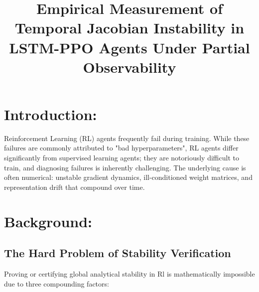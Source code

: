 \documentclass[11pt,a4paper]{article}
\title{\textbf{Empirical Measurement of Temporal Jacobian Instability in LSTM-PPO Agents Under Partial Observability }}
\begin{document}
\maketitle

\section{Introduction: }
Reinforcement Learning (RL) agents frequently fail during training. While these failures are commonly attributed to "bad hyperparameters", RL agents differ significantly from supervised learning agents; they are notoriously difficult to train, and diagnosing failures is inherently challenging. The underlying cause is often numerical: unstable gradient dynamics, ill-conditioned weight matrices, and representation drift that compound over time. 

\section{Background: }
\subsection{The Hard Problem of Stability Verification}
Proving or certifying global analytical stability in Rl is mathematically impossible due to three compounding factors: 
\end{document}
